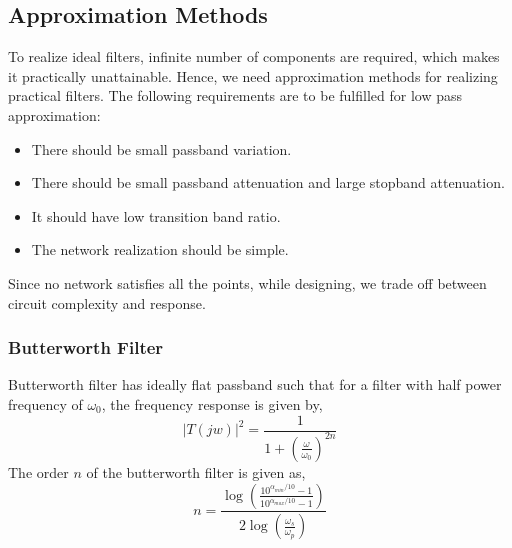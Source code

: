 \documentclass{lab_sheet}
\begin{document}
     \subsection{Approximation Methods}
   To realize ideal filters, infinite number of components are required, which makes it practically unattainable. Hence, we need approximation methods for realizing practical filters. 
 The following requirements are to be fulfilled for low pass approximation:
 \begin{itemize}
    \item There should be small passband variation.
    \item There should be small passband attenuation and large stopband attenuation.
    \item It should have low transition band ratio.
    \item The network realization should be simple.
 \end{itemize}
 Since no network satisfies all the points, while designing, we trade off between circuit complexity and response.
     \subsubsection{Butterworth Filter}
     Butterworth filter has ideally flat passband such that for a filter with half power frequency of $\omega_0$, the frequency response is given by,
     \begin{equation}
        |T(jw)|^2=\frac{1}{1+\left(\frac{\omega}{\omega_0}\right)^{2n}}
     \end{equation}
     The order $n$ of the butterworth filter is given as,
     \begin{equation}
        n=\frac{\log\left(\frac{10^{\alpha_{min}/10}-1}{10^{\alpha_{max}/10}-1}\right)}{2\log\left(\frac{\omega_s}{\omega_p}\right)}
     \end{equation}
\end{document}
